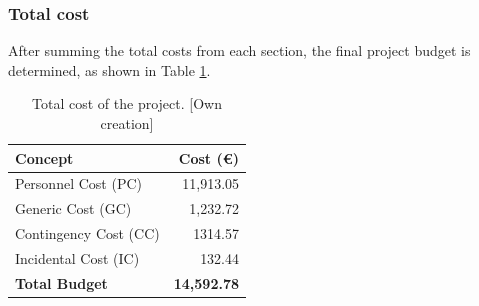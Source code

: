 \subsubsection{Total cost}
\label{sec:total-cost}

After summing the total costs from each section, the final project budget is determined, as shown in Table \ref{table:total-cost-of-project}.

\vspace{-1em}

\begin{table}[H]
    \renewcommand{\arraystretch}{1.2}
    \centering
    \footnotesize
    \begin{tabular}{@{}l r@{}}
     \textbf{Concept} & \textbf{Cost (€)} \\ [6pt]
     \hline 
     Personnel Cost (PC) & 11,913.05  \\
     Generic Cost (GC) & 1,232.72  \\
     Contingency Cost (CC) & 1314.57  \\
     Incidental Cost (IC) & 132.44  \\
     \hline
     \textbf{Total Budget} & \textbf{14,592.78}  \\
    \end{tabular}%
    \caption[Total cost of the project.]
    {Total cost of the project. [Own creation]} 
    \vspace{-1em}
    \label{table:total-cost-of-project}
\end{table}

\vspace{-15pt}

